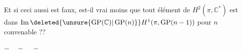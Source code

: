 Et si ceci aussi est faux, est-il  vrai  moins que tout élément de $H^2(\pi,\mathbb{C}^*)$ est dans $\operatorname{Im}\deleted{\unsure{\operatorname{GP}(\mathbb{C})|\operatorname{GP}(n)}}H^1(\pi,\operatorname{GP}(n-1))$ pour $n$ convenable ??

\noindent $-\quad-\quad-$
\margin{]}
